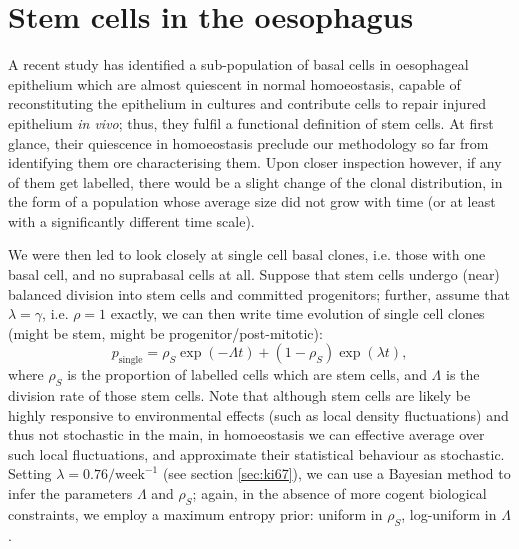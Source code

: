 \documentclass[10pt,english]{report}
\begin{document}
\section{\label{sec:oesophagus-stem}Stem cells in the oesophagus}

A recent study \citep{kabalis} has identified a sub-population of basal cells in oesophageal epithelium which are almost quiescent in normal homoeostasis, capable of reconstituting the epithelium in cultures and contribute cells to repair injured epithelium \emph{in vivo}; thus, they fulfil a functional definition of stem cells. At first glance, their quiescence in homoeostasis preclude our methodology so far from identifying them ore characterising them. Upon closer inspection however, if any of them get labelled, there would be a slight change of the clonal distribution, in the form of a population whose average size did not grow with time (or at least with a significantly different time scale).

We were then led to look closely at single cell basal clones, i.e. those with one basal cell, and no suprabasal cells at all. Suppose that stem cells undergo (near) balanced division into stem cells and committed progenitors; further, assume that $\lambda = \gamma$, i.e. $\rho=1$ exactly, we can then write time evolution of single cell clones (might be stem, might be progenitor/post-mitotic):
\begin{equation}
p_\textrm{single} = \rho_S \exp(-\Lambda t) + (1-\rho_S) \exp(\lambda t),
\label{eq:single-cell-clones}
\end{equation}
where $\rho_S$ is the proportion of labelled cells which are stem cells, and $\Lambda$ is the division rate of those stem cells. Note that although stem cells are likely be highly responsive to environmental effects (such as local density fluctuations) and thus not stochastic in the main, in homoeostasis we can effective average over such local fluctuations, and approximate their statistical behaviour as stochastic. Setting $\lambda = 0.76/\textrm{week}^{-1}$ (see section \ref{sec:ki67}), we can use a Bayesian method to infer the parameters $\Lambda$ and $\rho_S$; again, in the absence of more cogent biological constraints, we employ a maximum entropy prior: uniform in $\rho_S$, log-uniform in $\Lambda$.
\end{document}
